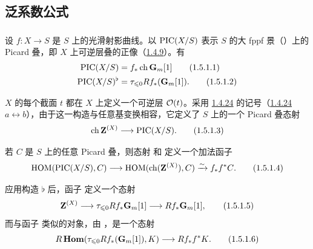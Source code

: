 \subsection{泛系数公式}

\subsubsection{}
设 $f:X\rightarrow S$ 是 $S$ 上的光滑射影曲线。以 $\operatorname{PIC}(X/S)$ 表示 $S$ 的大 fppf 景（）上的 Picard 叠，即 $X$ 上可逆层叠的正像（\hyperref[XVIII.subsubsec1.4.9]{1.4.9}）。有
\begin{align*}
\operatorname{PIC}(X/S)&= f_{\ast}\operatorname{ch}\mathbf{G}_{m}[1]\tag{1.5.1.1}\\
\operatorname{PIC}(X/S)^{\flat} &=\tau_{\leqslant 0}
Rf_{\ast}(\mathbf{G}_{m}[1]){}.\tag{1.5.1.2}
\end{align*}

$X$ 的每个截面 $t$ 都在 $X$ 上定义一个可逆层 ${\mathcal O}(t)$。采用 \hyperref[XVIII.subsubsec1.4.24]{1.4.24} 的记号（\cf \hyperref[XVIII.subsubsec1.4.24]{1.4.24} $a\leftrightarrow b$），由于这一构造与任意基变换相容，它定义了 $S$ 上的一个 Picard 叠态射
\begin{equation*}
\operatorname{ch} \mathbf{Z}^{(X)}\longrightarrow \operatorname{PIC}(X/S){}.\tag{1.5.1.3}
\end{equation*}

若 $C$ 是 $S$ 上的任意 Picard 叠，则态射  和  定义一个加法函子
\begin{equation*}
\operatorname{HOM}(\operatorname{PIC}(X/S),C)\longrightarrow\operatorname{HOM}(\operatorname{ch}(\mathbf{Z}^{(X)}),
C)\xrightarrow{\sim} f_{\ast}f^{\ast}C{}.\tag{1.5.1.4}
\end{equation*}

应用构造 $\flat$ 后，函子  定义一个态射
\begin{equation*}
\mathbf{Z}^{(X)}\longrightarrow \tau_{\leqslant 0}
Rf_{\ast}\mathbf{G}_{m}[1]\longrightarrow
Rf_{\ast}\mathbf{G}_{m}[1]{},\tag{1.5.1.5}
\end{equation*}%
而与函子  类似的对象，由 ，是一个态射
\begin{equation*}
R\operatorname{\mathbf{Hom}}(\tau_{\leqslant 0} Rf_{\ast}(\mathbf{G}_{m}[1]),K)\longrightarrow
Rf_{\ast} f^{\ast}K{}.\tag{1.5.1.6}
\end{equation*}

